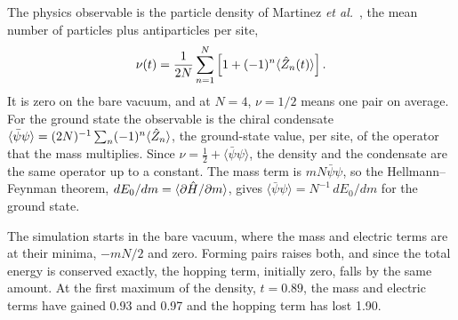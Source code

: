 The physics observable is the particle density of Martinez
\emph{et al.}~\cite{martinez2016}, the mean number of particles plus
antiparticles per site,
\begin{equation}
  \label{eq:nu}
  \nu(t) = \frac{1}{2N}\sum_{n=1}^{N}\left[1 + (-1)^n\langle\hat{Z}_{n}(t)\rangle\right].
\end{equation}
It is zero on the bare vacuum, and at $N = 4$, $\nu = 1/2$ means one pair on
average. For
the ground state the observable is the chiral condensate
$\langle\bar\psi\psi\rangle = (2N)^{-1}\sum_n (-1)^n\langle\hat{Z}_{n}\rangle$, the
ground-state value, per site, of the operator that the mass multiplies. Since
$\nu = \tfrac12 + \langle\bar\psi\psi\rangle$, the density and the condensate
are the same operator up to a constant. The mass term is
$mN\bar\psi\psi$, so the Hellmann--Feynman theorem,
$dE_0/dm = \langle\partial\hat{H}/\partial m\rangle$, gives
$\langle\bar\psi\psi\rangle = N^{-1}\,dE_0/dm$ for the ground state.

The simulation starts in the bare vacuum, where the mass and electric terms are
at their minima, $-mN/2$ and zero. Forming pairs raises both, and since the
total energy is conserved exactly, the hopping term, initially zero, falls by
the same amount. At the first maximum of the density, $t = 0.89$, the mass and
electric terms have gained 0.93 and 0.97 and the hopping term has lost 1.90.
